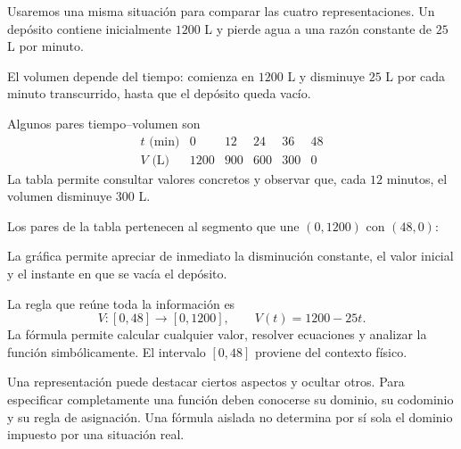 Usaremos una misma situación para comparar las cuatro representaciones. Un depósito contiene inicialmente $1200$ L y pierde agua a una razón constante de $25$ L por minuto.

\begin{ejemplo}
El volumen depende del tiempo: comienza en $1200$ L y disminuye $25$ L por cada minuto transcurrido, hasta que el depósito queda vacío.
\end{ejemplo}

\begin{ejemplo}
Algunos pares tiempo--volumen son
\[
\begin{array}{c|ccccc}
t\text{ (min)}&0&12&24&36&48\\ \hline
V\text{ (L)}&1200&900&600&300&0
\end{array}
\]
La tabla permite consultar valores concretos y observar que, cada $12$ minutos, el volumen disminuye $300$ L.
\end{ejemplo}

\begin{ejemplo}
Los pares de la tabla pertenecen al segmento que une $(0,1200)$ con $(48,0)$:
\begin{center}
\end{center}
La gráfica permite apreciar de inmediato la disminución constante, el valor inicial y el instante en que se vacía el depósito.
\end{ejemplo}

\begin{ejemplo}
La regla que reúne toda la información es
\[
V:[0,48]\to[0,1200],\qquad V(t)=1200-25t.
\]
La fórmula permite calcular cualquier valor, resolver ecuaciones y analizar la función simbólicamente. El intervalo $[0,48]$ proviene del contexto físico.
\end{ejemplo}

\begin{nota}
Una representación puede destacar ciertos aspectos y ocultar otros. Para especificar completamente una función deben conocerse su dominio, su codominio y su regla de asignación. Una fórmula aislada no determina por sí sola el dominio impuesto por una situación real.
\end{nota}

